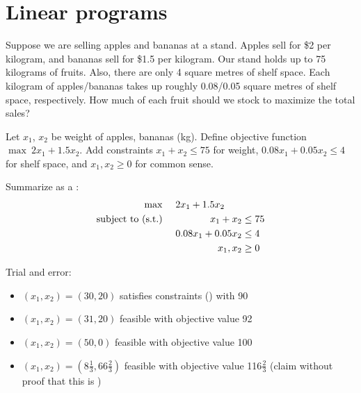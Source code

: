 \section{Linear programs}

\begin{example}
  Suppose we are selling apples and bananas at a stand.
  Apples sell for \$2 per kilogram, and bananas sell for \$1.5 per kilogram.
  Our stand holds up to 75 kilograms of fruits.
  Also, there are only 4 square metres of shelf space.
  Each kilogram of apples/bananas takes up roughly 0.08/0.05 square metres of shelf space, respectively.
  How much of each fruit should we stock to maximize the total sales?
\end{example}
\begin{sol}
  Let $x_1$, $x_2$ be weight of apples, bananas (kg).
  Define objective function $\max\ 2x_1 + 1.5x_2$.
  Add constraints $x_1 + x_2 \leq 75$ for weight, $0.08x_1 + 0.05x_2 \leq 4$ for shelf space, and $x_1, x_2 \geq 0$ for common sense.

  Summarize as a :
  \begin{equation*}
    \begin{aligned}
      \max\                      &  & \multicolumn{2}{l}{$2x_1 + 1.5x_2$}           \\
      \text{subject to (s.t.)}\  &  & x_1 + x_2                           & \leq 75 \\
                                 &  & 0.08x_1 + 0.05x_2                   & \leq 4  \\
                                 &  & x_1, x_2                            & \geq 0
    \end{aligned}
  \end{equation*}

  Trial and error:
  \begin{itemize}[nosep]
    \item $(x_1, x_2) = (30, 20)$ satisfies constraints () with  90
    \item $(x_1, x_2) = (31, 20)$ feasible with objective value 92
    \item $(x_1, x_2) = (50, 0)$ feasible with objective value 100
    \item $(x_1, x_2) = (8\frac13, 66\frac23)$ feasible with objective value 116$\frac23$
          (claim without proof that this is )
  \end{itemize}


\end{sol}
